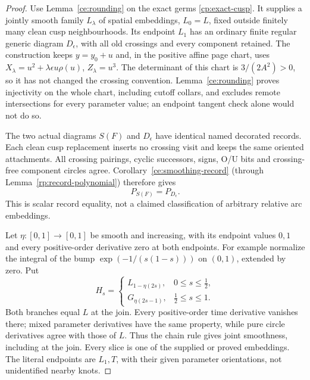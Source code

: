 \begin{proof}
Use Lemma~\ref{ce:rounding} on the exact germs
\eqref{cp:exact-cusp}. It supplies a jointly smooth family $L_\lambda$
of spatial embeddings, $L_0=L$, fixed outside finitely many clean cusp
neighbourhoods. Its endpoint $L_1$ has an ordinary finite regular generic
diagram $D_\epsilon$, with all old crossings and every component retained.
The construction keeps $y=y_0+u$ and, in the positive affine page chart,
uses $X_\lambda=u^2+\lambda\epsilon u\rho(u)$, $Z_\lambda=u^3$.
The determinant of this chart is $3/(2A^2)>0$, so it has not changed the
crossing convention. Lemma~\ref{ce:rounding} proves injectivity on the
whole chart, including cutoff collars, and excludes remote intersections
for every parameter value; an endpoint tangent check alone would not do so.

The two actual diagrams $S(F)$ and $D_\epsilon$ have identical named
decorated records. Each clean cusp replacement inserts no crossing visit
and keeps the same oriented attachments. All crossing pairings, cyclic
successors, signs, O/U bits and crossing-free component circles agree.
Corollary~\ref{ce:smoothing-record} (through
Lemma~\ref{rp:record-polynomial}) therefore gives
\begin{equation}\label{cp:smoothing-record}
                    P_{S(F)}=P_{D_\epsilon}.
\end{equation}
This is scalar record equality, not a claimed classification of arbitrary
relative arc embeddings.

Let $\eta:[0,1]\to[0,1]$ be smooth and increasing, with its endpoint
values $0,1$ and every positive-order derivative zero at both endpoints.
For example normalize the integral of the bump
$\exp(-1/(s(1-s)))$ on $(0,1)$, extended by zero. Put
\begin{equation}\label{cp:flattened-family}
 H_s=\begin{cases}
       L_{1-\eta(2s)},&0\leq s\leq\tfrac12,\\
       G_{\eta(2s-1)},&\tfrac12\leq s\leq1.
      \end{cases}
\end{equation}
Both branches equal $L$ at the join. Every positive-order time derivative
vanishes there; mixed parameter derivatives have the same property,
while pure circle derivatives agree with those of $L$. Thus the chain
rule gives joint smoothness, including at the join. Every slice is one
of the supplied or proved embeddings. The literal endpoints are $L_1,T$,
with their given parameter orientations, not unidentified nearby knots.


\end{proof}
